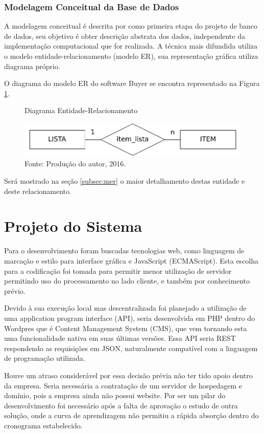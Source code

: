 \documentclass[
	12pt,
	openright,
	oneside, %
	a4paper,
	chapter=TITLE,
	section=TITLE,
	english,
	brazil %
	]{abntex2-udesc}
\begin{document}
\subsubsection{Modelagem Conceitual da Base de Dados}

A modelagem conceitual é descrita por  como primeira etapa do projeto de banco de dados, seu objetivo é obter descrição abstrata dos dados, independente da implementação computacional que for realizada. A técnica mais difundida utiliza o modelo entidade-relacionamento (modelo ER), sua representação gráfica utiliza diagrama próprio.

O diagrama do modelo ER do software Buyer se encontra representado na Figura \ref{fig:me}.

\begin{figure}[h]
\caption{Diagrama Entidade-Relacionamento}\label{fig:me}
\centering
\includegraphics{figures/mer.pdf}
\caption*{\footnotesize Fonte: Produção do autor, 2016.}
\end{figure}

Será mostrado na seção \ref{subsec:mer} o maior detalhamento destas entidade e deste relacionamento.

\section{Projeto do Sistema}

Para o desenvolvimento foram buscadas tecnologias web, como linguagem de marcação e estilo para interface gráfica e JavaScript (ECMAScript). Esta escolha para a codificação foi tomada para permitir menor utilização de servidor permitindo uso do processamento no lado cliente, e também por conhecimento prévio.

Devido à sua execução local mas descentralizada foi planejado a utilização de uma application program interface (API), seria desenvolvida em PHP dentro do Wordpres que é Content Management System (CMS), que vem tornando esta uma funcionalidade nativa em suas últimas versões. Essa API seria REST respondendo as requisições em JSON, naturalmente compatível com a linguagem de programação utilizada.

Houve um atraso considerável por essa decisão prévia não ter tido apoio dentro da empresa. Seria necessária a contratação de um servidor de hospedagem e domínio, pois a empresa ainda não possui website. Por ser um pilar do desenvolvimento foi necessário após a falta de aprovação o estudo de outra solução, onde a curva de aprendizagem não permitiu a rápida absorção dentro do cronograma estabelecido.
\end{document}

